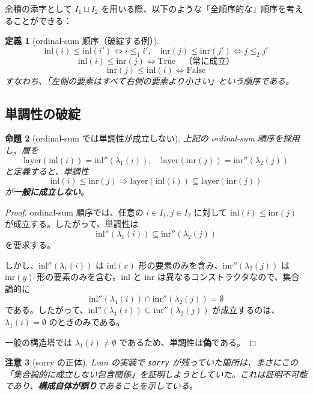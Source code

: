 \documentclass[a4paper,12pt]{ltjsarticle}
\newtheorem{definition}{定義}[section]
\newtheorem{proposition}[definition]{命題}
\newtheorem{remark}[definition]{注意}
\theoremstyle{definition}
\begin{document}
余積の添字として $I_1 \sqcup I_2$ を用いる際、以下のような「全順序的な」順序を考えることができる：

\begin{definition}[ordinal-sum 順序（破綻する例）]
\[
\mathrm{inl}(i) \leq \mathrm{inl}(i') \iff i \leq_1 i', \quad
\mathrm{inr}(j) \leq \mathrm{inr}(j') \iff j \leq_2 j'
\]
\[
\mathrm{inl}(i) \leq \mathrm{inr}(j) \iff \mathrm{True} \quad \text{（常に成立）}
\]
\[
\mathrm{inr}(j) \leq \mathrm{inl}(i) \iff \mathrm{False}
\]
すなわち、「左側の要素はすべて右側の要素より小さい」という順序である。
\end{definition}

\subsection{単調性の破綻}

\begin{proposition}[ordinal-sum では単調性が成立しない]
上記の ordinal-sum 順序を採用し、層を
\[
\text{layer}(\mathrm{inl}(i)) = \mathrm{inl}''(\lambda_1(i)), \quad
\text{layer}(\mathrm{inr}(j)) = \mathrm{inr}''(\lambda_2(j))
\]
と定義すると、単調性
\[
\mathrm{inl}(i) \leq \mathrm{inr}(j) \Rightarrow \text{layer}(\mathrm{inl}(i)) \subseteq \text{layer}(\mathrm{inr}(j))
\]
が\textbf{一般に成立しない}。
\end{proposition}

\begin{proof}
ordinal-sum 順序では、任意の $i \in I_1, j \in I_2$ に対して $\mathrm{inl}(i) \leq \mathrm{inr}(j)$ が成立する。したがって、単調性は
\[
\mathrm{inl}''(\lambda_1(i)) \subseteq \mathrm{inr}''(\lambda_2(j))
\]
を要求する。

しかし、$\mathrm{inl}''(\lambda_1(i))$ は $\mathrm{inl}(x)$ 形の要素のみを含み、$\mathrm{inr}''(\lambda_2(j))$ は $\mathrm{inr}(y)$ 形の要素のみを含む。$\mathrm{inl}$ と $\mathrm{inr}$ は異なるコンストラクタなので、集合論的に
\[
\mathrm{inl}''(\lambda_1(i)) \cap \mathrm{inr}''(\lambda_2(j)) = \emptyset
\]
である。したがって、$\mathrm{inl}''(\lambda_1(i)) \subseteq \mathrm{inr}''(\lambda_2(j))$ が成立するのは、$\lambda_1(i) = \emptyset$ のときのみである。

一般の構造塔では $\lambda_1(i) \neq \emptyset$ であるため、単調性は\textbf{偽}である。
\end{proof}

\begin{remark}[sorry の正体]
Lean の実装で \texttt{sorry} が残っていた箇所は、まさにこの「集合論的に成立しない包含関係」を証明しようとしていた。これは証明不可能であり、\textbf{構成自体が誤り}であることを示している。
\end{remark}
\end{document}

